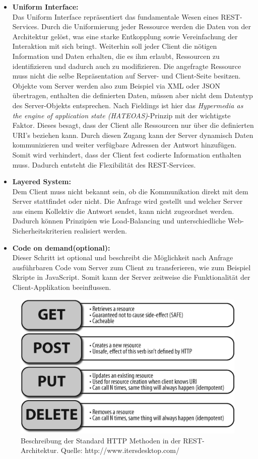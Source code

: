 \documentclass[fleqn,10pt,ngerman]{SelfArx}
\begin{document}
\begin{itemize}
	\item \textbf{Uniform Interface:}\\ Das Uniform Interface repräsentiert das fundamentale Wesen eines REST-Services. Durch die Uniformierung jeder Ressource werden die Daten von der Architektur gelöst, was eine starke Entkopplung sowie Vereinfachung der Interaktion mit sich bringt. Weiterhin soll jeder Client die nötigen Information und Daten erhalten, die es ihm erlaubt, Ressourcen zu identifizieren und dadurch auch zu modifizieren. Die angefragte Ressource muss nicht die selbe Repräsentation auf Server- und Client-Seite besitzen. Objekte vom Server werden also zum Beispiel via XML oder JSON übertragen, enthalten die definierten Daten, müssen aber nicht dem Datentyp des Server-Objekts entsprechen. Nach Fieldings ist hier das \textit{Hypermedia as the engine of application state (HATEOAS)}-Prinzip mit der wichtigste Faktor. Dieses besagt, dass der Client alle Ressourcen nur über die definierten URI's beziehen kann. Durch diesen Zugang kann der Server dynamisch Daten kommunizieren und weiter verfügbare Adressen der Antwort hinzufügen. Somit wird verhindert, dass der Client fest codierte Information enthalten muss. Dadurch entsteht die Flexibilität des REST-Services.
	\item \textbf{Layered System:}\\ Dem Client muss nicht bekannt sein, ob die Kommunikation direkt mit dem Server stattfindet oder nicht. Die Anfrage wird gestellt und welcher Server aus einem Kollektiv die Antwort sendet, kann nicht zugeordnet werden. Dadurch können Prinzipien wie Load-Balancing und unterschiedliche Web-Sicherheitskriterien realisiert werden. 
	\item \textbf{Code on demand(optional):}\\ Dieser Schritt ist optional und beschreibt die Möglichkeit nach Anfrage ausführbaren Code vom Server zum Client zu transferieren, wie zum Beispiel Skripte in JavaScript. Somit kann der Server zeitweise die Funktionalität der Client-Applikation beeinflussen.
\end{itemize} 

\begin{figure}[ht]\centering
	\includegraphics[width=8.5 cm]{Abbildungen/RESTful-operations}
	\caption{Beschreibung der Standard HTTP Methoden in der REST-Architektur. Quelle: http://www.itersdesktop.com/}
	\label{fig:restCalls}
\end{figure}
\end{document}
